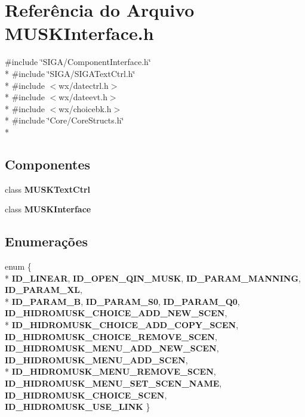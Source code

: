 \section{Referência do Arquivo M\+U\+S\+K\+Interface.\+h}
\label{_m_u_s_k_interface_8h}
{\ttfamily \#include \char`\"{}S\+I\+G\+A/\+Component\+Interface.\+h\char`\"{}}\\*
{\ttfamily \#include \char`\"{}S\+I\+G\+A/\+S\+I\+G\+A\+Text\+Ctrl.\+h\char`\"{}}\\*
{\ttfamily \#include $<$wx/datectrl.\+h$>$}\\*
{\ttfamily \#include $<$wx/dateevt.\+h$>$}\\*
{\ttfamily \#include $<$wx/choicebk.\+h$>$}\\*
{\ttfamily \#include \char`\"{}Core/\+Core\+Structs.\+h\char`\"{}}\\*
\subsection*{Componentes}
\begin{DoxyCompactItemize}
\item 
class {\bf M\+U\+S\+K\+Text\+Ctrl}
\item 
class {\bf M\+U\+S\+K\+Interface}
\end{DoxyCompactItemize}
\subsection*{Enumerações}
\begin{DoxyCompactItemize}
\item 
enum \{ \\*
{\bf I\+D\+\_\+\+L\+I\+N\+E\+AR}, 
{\bf I\+D\+\_\+\+O\+P\+E\+N\+\_\+\+Q\+I\+N\+\_\+\+M\+U\+SK}, 
{\bf I\+D\+\_\+\+P\+A\+R\+A\+M\+\_\+\+M\+A\+N\+N\+I\+NG}, 
{\bf I\+D\+\_\+\+P\+A\+R\+A\+M\+\_\+\+XL}, 
\\*
{\bf I\+D\+\_\+\+P\+A\+R\+A\+M\+\_\+B}, 
{\bf I\+D\+\_\+\+P\+A\+R\+A\+M\+\_\+\+S0}, 
{\bf I\+D\+\_\+\+P\+A\+R\+A\+M\+\_\+\+Q0}, 
{\bf I\+D\+\_\+\+H\+I\+D\+R\+O\+M\+U\+S\+K\+\_\+\+C\+H\+O\+I\+C\+E\+\_\+\+A\+D\+D\+\_\+\+N\+E\+W\+\_\+\+S\+C\+EN}, 
\\*
{\bf I\+D\+\_\+\+H\+I\+D\+R\+O\+M\+U\+S\+K\+\_\+\+C\+H\+O\+I\+C\+E\+\_\+\+A\+D\+D\+\_\+\+C\+O\+P\+Y\+\_\+\+S\+C\+EN}, 
{\bf I\+D\+\_\+\+H\+I\+D\+R\+O\+M\+U\+S\+K\+\_\+\+C\+H\+O\+I\+C\+E\+\_\+\+R\+E\+M\+O\+V\+E\+\_\+\+S\+C\+EN}, 
{\bf I\+D\+\_\+\+H\+I\+D\+R\+O\+M\+U\+S\+K\+\_\+\+M\+E\+N\+U\+\_\+\+A\+D\+D\+\_\+\+N\+E\+W\+\_\+\+S\+C\+EN}, 
{\bf I\+D\+\_\+\+H\+I\+D\+R\+O\+M\+U\+S\+K\+\_\+\+M\+E\+N\+U\+\_\+\+A\+D\+D\+\_\+\+S\+C\+EN}, 
\\*
{\bf I\+D\+\_\+\+H\+I\+D\+R\+O\+M\+U\+S\+K\+\_\+\+M\+E\+N\+U\+\_\+\+R\+E\+M\+O\+V\+E\+\_\+\+S\+C\+EN}, 
{\bf I\+D\+\_\+\+H\+I\+D\+R\+O\+M\+U\+S\+K\+\_\+\+M\+E\+N\+U\+\_\+\+S\+E\+T\+\_\+\+S\+C\+E\+N\+\_\+\+N\+A\+ME}, 
{\bf I\+D\+\_\+\+H\+I\+D\+R\+O\+M\+U\+S\+K\+\_\+\+C\+H\+O\+I\+C\+E\+\_\+\+S\+C\+EN}, 
{\bf I\+D\+\_\+\+H\+I\+D\+R\+O\+M\+U\+S\+K\+\_\+\+U\+S\+E\+\_\+\+L\+I\+NK}
 \}
\end{DoxyCompactItemize}

